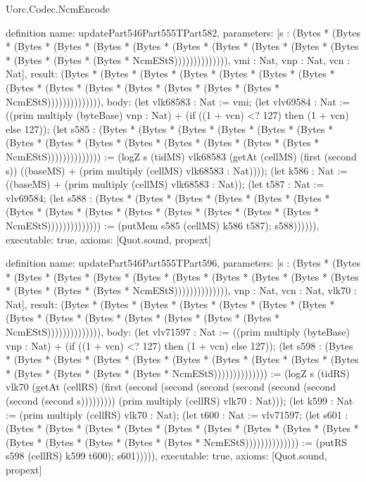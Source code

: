 \begin{lexlean}{Uorc.Codec.NcmEncode}
\begin{semanticmodule}
definition{
  name: updatePart546Part555TPart582,
  parameters: [s : (Bytes * (Bytes * (Bytes * (Bytes * (Bytes * (Bytes * (Bytes * (Bytes * (Bytes * (Bytes * (Bytes * (Bytes * (Bytes * (Bytes * NcmEStS)))))))))))))), vmi : Nat, vnp : Nat, vcn : Nat],
  result: (Bytes * (Bytes * (Bytes * (Bytes * (Bytes * (Bytes * (Bytes * (Bytes * (Bytes * (Bytes * (Bytes * (Bytes * (Bytes * (Bytes * NcmEStS)))))))))))))),
  body: (let vlk68583 : Nat := vmi; (let vlv69584 : Nat := ((prim multiply (byteBase) vnp : Nat) + (if ((1 + vcn) <? 127) then (1 + vcn) else 127)); (let s585 : (Bytes * (Bytes * (Bytes * (Bytes * (Bytes * (Bytes * (Bytes * (Bytes * (Bytes * (Bytes * (Bytes * (Bytes * (Bytes * (Bytes * NcmEStS)))))))))))))) := (logZ s (tidMS) vlk68583 (getAt (cellMS) (first (second s)) ((baseMS) + (prim multiply (cellMS) vlk68583 : Nat)))); (let k586 : Nat := ((baseMS) + (prim multiply (cellMS) vlk68583 : Nat)); (let t587 : Nat := vlv69584; (let s588 : (Bytes * (Bytes * (Bytes * (Bytes * (Bytes * (Bytes * (Bytes * (Bytes * (Bytes * (Bytes * (Bytes * (Bytes * (Bytes * (Bytes * NcmEStS)))))))))))))) := (putMem s585 (cellMS) k586 t587); s588)))))),
  executable: true,
  axioms: [Quot.sound, propext]
}

definition{
  name: updatePart546Part555TPart596,
  parameters: [s : (Bytes * (Bytes * (Bytes * (Bytes * (Bytes * (Bytes * (Bytes * (Bytes * (Bytes * (Bytes * (Bytes * (Bytes * (Bytes * (Bytes * NcmEStS)))))))))))))), vnp : Nat, vcn : Nat, vlk70 : Nat],
  result: (Bytes * (Bytes * (Bytes * (Bytes * (Bytes * (Bytes * (Bytes * (Bytes * (Bytes * (Bytes * (Bytes * (Bytes * (Bytes * (Bytes * NcmEStS)))))))))))))),
  body: (let vlv71597 : Nat := ((prim multiply (byteBase) vnp : Nat) + (if ((1 + vcn) <? 127) then (1 + vcn) else 127)); (let s598 : (Bytes * (Bytes * (Bytes * (Bytes * (Bytes * (Bytes * (Bytes * (Bytes * (Bytes * (Bytes * (Bytes * (Bytes * (Bytes * (Bytes * NcmEStS)))))))))))))) := (logZ s (tidRS) vlk70 (getAt (cellRS) (first (second (second (second (second (second (second (second (second s))))))))) (prim multiply (cellRS) vlk70 : Nat))); (let k599 : Nat := (prim multiply (cellRS) vlk70 : Nat); (let t600 : Nat := vlv71597; (let s601 : (Bytes * (Bytes * (Bytes * (Bytes * (Bytes * (Bytes * (Bytes * (Bytes * (Bytes * (Bytes * (Bytes * (Bytes * (Bytes * (Bytes * NcmEStS)))))))))))))) := (putRS s598 (cellRS) k599 t600); s601))))),
  executable: true,
  axioms: [Quot.sound, propext]
}


\end{semanticmodule}
\end{lexlean}

